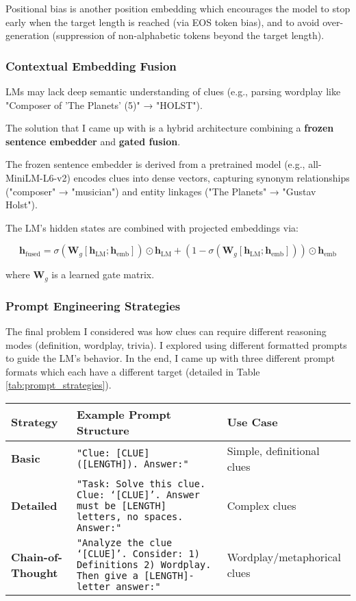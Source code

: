 \documentclass[
	a4paper, %
	10pt, %
	unnumberedsections, %
	twoside, %
]{LTJournalArticle}
\begin{document}
Positional bias is another position embedding which encourages the model to stop early when the target length is reached (via EOS token bias), and to avoid over-generation (suppression of non-alphabetic tokens beyond the target length).

\subsubsection{Contextual Embedding Fusion}
LMs may lack deep semantic understanding of clues (e.g., parsing wordplay like "Composer of 'The Planets' (5)" → "HOLST").

The solution that I came up with is a hybrid architecture combining a \textbf{frozen sentence embedder} and \textbf{gated fusion}.

The frozen sentence embedder is derived from a pretrained model (e.g., all-MiniLM-L6-v2) encodes clues into dense vectors, capturing synonym relationships ("composer" → "musician") and entity linkages ("The Planets" → "Gustav Holst").

The LM’s hidden states are combined with projected embeddings via:

\[\mathbf{h}_{\text{fused}} = \sigma\left(\mathbf{W}_g \left[\mathbf{h}_{\text{LM}}; \mathbf{h}_{\text{emb}}\right]\right) \odot \mathbf{h}_{\text{LM}} + \left(1 - \sigma\left(\mathbf{W}_g \left[\mathbf{h}_{\text{LM}}; \mathbf{h}_{\text{emb}}\right]\right)\right) \odot \mathbf{h}_{\text{emb}}\]

where $\mathbf{W}_g$ is a learned gate matrix.

\subsubsection{Prompt Engineering Strategies}

The final problem I considered was how clues can require different reasoning modes (definition, wordplay, trivia). I explored using different formatted prompts to guide the LM’s behavior. In the end, I came up with three different prompt formats which each have a different target (detailed in Table \ref{tab:prompt_strategies}).

\begin{table*}[h]
	\centering
	\caption{Prompt Engineering Strategies for Crossword Solving}
	\label{tab:prompt_strategies}
	\begin{tabular}{lp{8cm}l}
		\hline
		\textbf{Strategy} & \textbf{Example Prompt Structure} & \textbf{Use Case} \\
		\hline
		\textbf{Basic} & \texttt{"Clue: [CLUE] ([LENGTH]). Answer:"} & Simple, definitional clues \\
		\hline
		\textbf{Detailed} & \texttt{"Task: Solve this clue. Clue: `[CLUE]'. Answer must be [LENGTH] letters, no spaces. Answer:"} & Complex clues \\
		\hline
		\textbf{Chain-of-Thought} & \texttt{"Analyze the clue `[CLUE]'. Consider: 1) Definitions 2) Wordplay. Then give a [LENGTH]-letter answer:"} & Wordplay/metaphorical clues \\
		\hline
	\end{tabular}
\end{table*}
\end{document}
